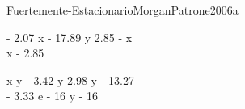 
\begin{bilevelmodel}{Fuertemente-Estacionario}{MorganPatrone2006a}
    \begin{upperlevel}{- 2.07 x - 17.89 y}{
         2.85 - x  \\ 
 x - 2.85 
    }
    \end{upperlevel}
    \begin{lowerlevel}{x y - 3.42 y}{
         2.98 y - 13.27  \\ 
 - 3.33 e - 16 y - 16 
    }
    \end{lowerlevel}
\end{bilevelmodel}
    
        